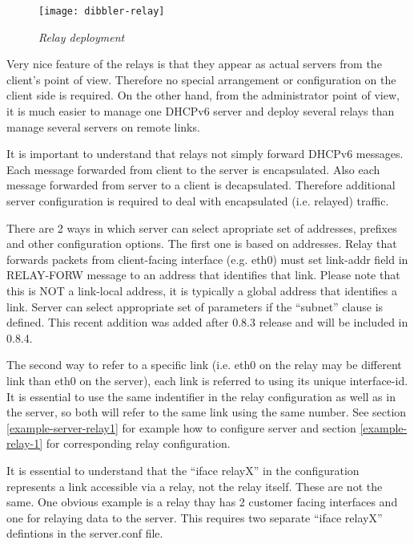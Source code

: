 \begin{figure}[ht]
\begin{center}
\texttt{[image: dibbler-relay]}
\caption{\emph{Relay deployment}}
\end{center}
\end{figure}

Very nice feature of the relays is that they appear as actual servers
from the client's point of view. Therefore no special arrangement or
configuration on the client side is required. On the other hand, from
the administrator point of view, it is much easier to manage one DHCPv6
server and deploy several relays than manage several servers on remote
links.

It is important to understand that relays not simply forward DHCPv6
messages. Each message forwarded from client to the server is
encapsulated. Also each message forwarded from server to a client is
decapsulated. Therefore additional server configuration is required to
deal with encapsulated (i.e. relayed) traffic.

There are 2 ways in which server can select apropriate set of
addresses, prefixes and other configuration options. The first one is
based on addresses. Relay that forwards packets from client-facing
interface (e.g. eth0) must set link-addr field in RELAY-FORW message
to an address that identifies that link. Please note that this is NOT
a link-local address, it is typically a global address that identifies
a link. Server can select appropriate set of parameters if the
``subnet'' clause is defined. This recent addition was added after
0.8.3 release and will be included in 0.8.4. 

The second way to refer to a specific link (i.e. eth0 on the relay may
be different link than eth0 on the server), each link is referred to
using its unique interface-id. It is essential to use the same
indentifier in the relay configuration as well as in the server, so
both will refer to the same link using the same number. See
section \ref{example-server-relay1} for example how to configure
server and section \ref{example-relay-1} for corresponding relay
configuration.

It is essential to understand that the ``iface relayX'' in the
configuration represents a link accessible via a relay, not the relay
itself. These are not the same. One obvious example is a relay thay
has 2 customer facing interfaces and one for relaying data to the
server. This requires two separate ``iface relayX'' defintions in the
server.conf file.

